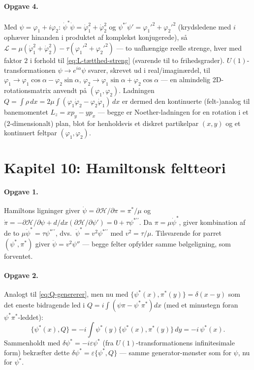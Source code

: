 \paragraph{Opgave 4.} Med $\psi=\varphi_1+i\varphi_2$:
$\dot\psi^\ast\dot\psi=\dot\varphi_1^2+\dot\varphi_2^2$ og
$\psi^{\ast\prime}\psi'=\varphi_1'^2+\varphi_2'^2$ (krydsledene med
$i$ ophæver hinanden i produktet af komplekst konjugerede), så
$\mathcal{L}=\mu(\dot\varphi_1^2+\dot\varphi_2^2)-\tau(\varphi_1'^2+\varphi_2'^2)$
— to uafhængige reelle strenge, hver med faktor $2$ i forhold til
\eqref{eq:L-tætthed-streng} (svarende til to frihedsgrader). $U(1)$-
transformationen $\psi\to e^{i\alpha}\psi$ svarer, skrevet ud i
real/imaginærdel, til $\varphi_1\to\varphi_1\cos\alpha-\varphi_2\sin\alpha$,
$\varphi_2\to\varphi_1\sin\alpha+\varphi_2\cos\alpha$ — en almindelig
2D-rotationsmatrix anvendt på $(\varphi_1,\varphi_2)$. Ladningen
$Q=\int\rho\,dx=2\mu\int(\varphi_1\dot\varphi_2-\varphi_2\dot\varphi_1)\,dx$
er dermed den kontinuerte (felt-)analog til banemomentet
$L_z=xp_y-yp_x$ — begge er Noether-ladningen for en rotation i et
($2$-dimensionalt) plan, blot for henholdsvis et diskret
partikelpar $(x,y)$ og et kontinuert feltpar $(\varphi_1,\varphi_2)$.

\section*{Kapitel 10: Hamiltonsk feltteori}

\paragraph{Opgave 1.} Hamiltons ligninger giver
$\dot\psi=\partial\mathcal{H}/\partial\pi=\pi^\ast/\mu$ og
$\dot\pi=-\partial\mathcal{H}/\partial\psi+d/dx(\partial\mathcal{H}/\partial\psi')
=0+\tau\psi^{\ast\prime\prime}$. Da $\pi=\mu\dot\psi^\ast$, giver
kombination af de to $\mu\ddot\psi^\ast=\tau\psi^{\ast\prime\prime}$,
dvs.\ $\ddot\psi^\ast=v^2\psi^{\ast\prime\prime}$ med $v^2=\tau/\mu$.
Tilsvarende for parret $(\psi^\ast,\pi^\ast)$ giver
$\ddot\psi=v^2\psi''$ — begge felter opfylder samme bølgeligning,
som forventet.

\paragraph{Opgave 2.} Analogt til \eqref{eq:Q-genererer}, men nu med
$\{\psi^\ast(x),\pi^\ast(y)\}=\delta(x-y)$ som det eneste bidragende
led i $Q=i\int(\psi\pi-\psi^\ast\pi^\ast)dx$ (med et minustegn foran
$\psi^\ast\pi^\ast$-leddet):
\begin{equation*}
  \{\psi^\ast(x),Q\} = -i\int\psi^\ast(y)\{\psi^\ast(x),\pi^\ast(y)\}\,dy
  = -i\,\psi^\ast(x).
\end{equation*}
Sammenholdt med $\delta\psi^\ast=-i\varepsilon\psi^\ast$ (fra
$U(1)$-transformationens infinitesimale form) bekræfter dette
$\delta\psi^\ast=\varepsilon\{\psi^\ast,Q\}$ — samme generator-mønster
som for $\psi$, nu for $\psi^\ast$.
